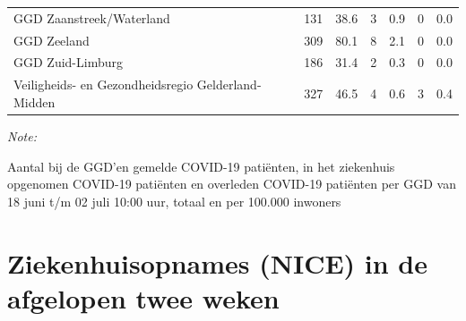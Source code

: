 \documentclass[
  english,
  man,floatsintext]{apa6}
\begin{document}
\begin{table}
\begin{threeparttable}
\begin{tabular}{lrrrrrr}
GGD Zaanstreek/Waterland & 131 & 38.6 & 3 & 0.9 & 0 & 0.0\\
GGD Zeeland & 309 & 80.1 & 8 & 2.1 & 0 & 0.0\\
GGD Zuid-Limburg & 186 & 31.4 & 2 & 0.3 & 0 & 0.0\\
Veiligheids- en Gezondheidsregio Gelderland-Midden & 327 & 46.5 & 4 & 0.6 & 3 & 0.4\\
\bottomrule
\end{tabular}
\begin{tablenotes}
\item \textit{Note: } 
\item Aantal bij de GGD’en gemelde COVID-19 patiënten, in het ziekenhuis opgenomen COVID-19 patiënten en overleden COVID-19 patiënten per GGD van 18 juni t/m 02 juli 10:00 uur, totaal en per 100.000 inwoners
\end{tablenotes}
\end{threeparttable}
\endgroup{}
\end{table}

\newpage

\hypertarget{ziekenhuisopnames-nice-in-de-afgelopen-twee-weken}{%
\section{Ziekenhuisopnames (NICE) in de afgelopen twee weken}\label{ziekenhuisopnames-nice-in-de-afgelopen-twee-weken}}
\end{document}
